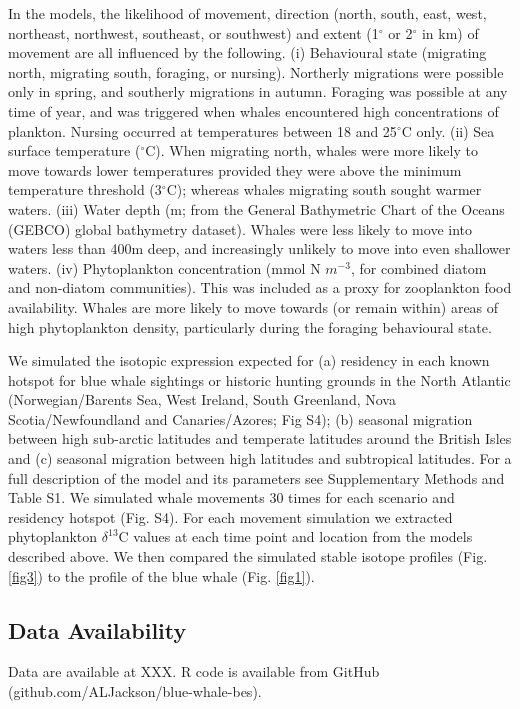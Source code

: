 \documentclass[a4paper,12pt]{article}
\begin{document}
In the models, the likelihood of movement, direction (north, south, east, west, northeast, northwest, southeast, or southwest) and extent (1$^{\circ}$ or 2$^{\circ}$ in km) of movement are all influenced by the following. 
(i) Behavioural state (migrating north, migrating south, foraging, or nursing). 
Northerly migrations were possible only in spring, and southerly migrations in autumn. 
Foraging was possible at any time of year, and was triggered when whales encountered high concentrations of plankton. Nursing occurred at temperatures between 18 and 25$^{\circ}$C only. 
(ii) Sea surface temperature ($^{\circ}$C\cite{yool2013medusa}). 
When migrating north, whales were more likely to move towards lower temperatures provided they were above the minimum temperature threshold (3$^{\circ}$C); whereas whales migrating south sought warmer waters. 
(iii) Water depth (m; from the General Bathymetric Chart of the Oceans (GEBCO) global bathymetry dataset). 
Whales were less likely to move into waters less than 400m deep, and increasingly unlikely to move into even shallower waters. 
(iv) Phytoplankton concentration (mmol N $m^{-3}$, for combined diatom and non-diatom communities\cite{yool2013medusa}). 
This was included as a proxy for zooplankton food availability. 
Whales are more likely to move towards (or remain within) areas of high phytoplankton density, particularly during the foraging behavioural state. 
 
We simulated the isotopic expression expected for (a) residency in each known hotspot for blue whale sightings or historic hunting grounds in the North Atlantic (Norwegian/Barents Sea, West Ireland, South Greenland, Nova Scotia/Newfoundland and Canaries/Azores\cite{mcdonald2006biogeographic,reilly2008balaenoptera,sigurjonsson1995life}; Fig S4); (b) seasonal migration between high sub-arctic latitudes and temperate latitudes around the British Isles and (c) seasonal migration between high latitudes and subtropical latitudes. 
For a full description of the model and its parameters see Supplementary Methods and Table S1. 
We simulated whale movements 30 times for each scenario and residency hotspot (Fig. S4). 
For each movement simulation we extracted phytoplankton $\delta^{13}$C values at each time point and location from the models described above\cite{magozzi2017using}. 
We then compared the simulated stable isotope profiles (Fig. \ref{fig3}) to the profile of the blue whale (Fig. \ref{fig1}).
 
\subsection{Data Availability}
Data are available at XXX. 
R code is available from GitHub (github.com/ALJackson/blue-whale-bes).
\end{document}
